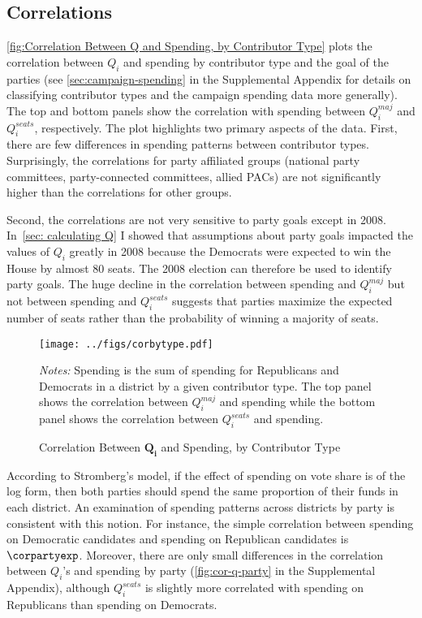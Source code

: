\documentclass[12pt,final,fleqn]{article}
\theoremstyle{plain}
\begin{document}
\subsection{Correlations}
\autoref{fig:Correlation Between Q and Spending, by Contributor Type} plots the correlation between $Q_i$ and spending by contributor type and the goal of the parties (see \autoref*{sec:campaign-spending} in the Supplemental Appendix for details on classifying contributor types and the campaign spending data more generally). The top and bottom panels show the correlation with spending between $Q_i^{maj}$ and $Q_i^{seats}$, respectively. The plot highlights two primary aspects of the data. First, there are few differences in spending patterns between contributor types. Surprisingly, the correlations for party affiliated groups (national party committees, party-connected committees, allied PACs) are not significantly higher than the correlations for other groups. 

Second, the correlations are not very sensitive to party goals except in 2008. In~\autoref{sec: calculating Q} I showed that assumptions about party goals impacted the values of $Q_i$ greatly in 2008 because the Democrats were expected to win the House by almost 80 seats. The 2008 election can therefore be used to identify party goals. The huge decline in the correlation between spending and $Q_i^{maj}$ but not between spending and $Q_i^{seats}$ suggests that parties maximize the expected number of seats rather than the probability of winning a majority of seats. 

\begin{figure}[!htb]
\texttt{[image: ../figs/corbytype.pdf]}
\vspace{.5cm}
\caption{Correlation Between $\mathbf{Q_i}$ and Spending, by Contributor Type}
\label{fig:Correlation Between Q and Spending, by Contributor Type}
\begin{minipage}{\linewidth}
\footnotesize
\emph{Notes:} Spending is the sum of spending for Republicans and Democrats in a district by a given contributor type. The top panel shows the correlation between $Q_i^{maj}$ and spending while the bottom panel shows the correlation between $Q_i^{seats}$ and spending.
\end{minipage}
\end{figure}

According to Stromberg's model, if the effect of spending on vote share is of the log form, then both parties should spend the same proportion of their funds in each district. An examination of spending patterns across districts by party is consistent with this notion. For instance, the simple correlation between spending on Democratic candidates and spending on Republican candidates is $\corpartyexp$. Moreover, there are only small differences in the correlation between $Q_i$'s and spending by party (\autoref*{fig:cor-q-party} in the Supplemental Appendix), although $Q_i^{seats}$ is slightly more correlated with spending on Republicans than spending on Democrats.
\end{document}
